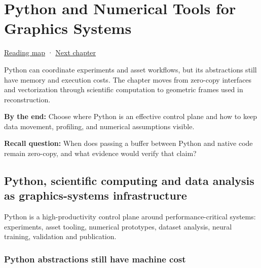 \chapter{Python and Numerical Tools for Graphics Systems}\label{01-foundations-i-ch017-python-and-numerical-tools-for-graphics-systems}\hypertarget{01-foundations-i-ch017}{}\label{stagechapter:01-foundations-i-ch017}

\hypertarget{01-foundations-i-ch017-python-and-numerical-tools-for-graphics-systems}{}

\hyperref[volume-reading-map]{Reading map} · \hyperref[01-foundations-i-ch018-vectors-for-light-and-frames]{Next chapter}

Python can coordinate experiments and asset workflows, but its abstractions still have memory and execution costs. The chapter moves from zero-copy interfaces and vectorization through scientific computation to geometric frames used in reconstruction.

\textbf{By the end:} Choose where Python is an effective control plane and how to keep data movement, profiling, and numerical assumptions visible.

\textbf{Recall question:} When does passing a buffer between Python and native code remain zero-copy, and what evidence would verify that claim?

\section{Python, scientific computing and data analysis as graphics-systems infrastructure}\label{01-foundations-i-ch017-python-scientific-computing-and-data-analysis-as-graphics-systems-infrastructure}

\hypertarget{01-foundations-i-ch017-python-scientific-computing-and-data-analysis-as-graphics-systems-infrastructure}{}

Python is a high-productivity control plane around performance-critical systems: experiments, asset tooling, numerical prototypes, dataset analysis, neural training, validation and publication.

\subsection{Python abstractions still have machine cost}\label{01-foundations-i-ch017-python-abstractions-still-have-machine-cost}

\hypertarget{01-foundations-i-ch017-python-abstractions-still-have-machine-cost}{}


